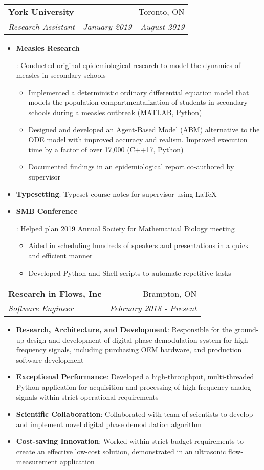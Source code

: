 \documentclass[letterpaper,10pt]{article}
\makeatletter
\newcommand{\resumeItem}[2]{
  \item\small{
    \textbf{#1}{: #2 \vspace{-2pt}}
  }
}
\newcommand{\resumeSubheading}[4]{
  \vspace{-1pt}\item[]
  \begin{tabular*}{0.98\textwidth}{l@{\extracolsep{\fill}}r}
      \hspace{-10pt}\textbf{#1} & #2 \\
      \hspace{-10pt}\textit{\small#3} & \textit{\small #4} \\
    \end{tabular*}\vspace{-5pt}
}
\newcommand{\resumeItemListStart}{\begin{itemize}}
\newcommand{\resumeItemListEnd}{\end{itemize}\vspace{-5pt}}
\makeatother
\begin{document}
    \resumeSubheading
      {York University}{Toronto, ON}
      {Research Assistant}{January 2019 - August 2019}
      \resumeItemListStart
        \resumeItem{Measles Research}
          {Conducted original epidemiological research to model the dynamics of measles in secondary schools
            \begin{itemize}
                \item Implemented a deterministic ordinary differential equation model that models the population compartmentalization of students in secondary schools during a measles outbreak (MATLAB, Python)
                \item Designed and developed an Agent-Based Model (ABM) alternative to the ODE model with improved accuracy and realism. Improved execution time by a factor of over 17,000 (C++17, Python)
                \item Documented findings in an epidemiological report co-authored by supervisor
            \end{itemize}
          }
        \resumeItem{Typesetting}
          {Typeset course notes for supervisor using \LaTeX{}}
        \resumeItem{SMB Conference}
          {Helped plan 2019 Annual Society for Mathematical Biology meeting
          \begin{itemize}
              \item Aided in scheduling hundreds of speakers and presentations in a quick and efficient manner
              \item Developed Python and Shell scripts to automate repetitive tasks
          \end{itemize}
          }
      \resumeItemListEnd

    \resumeSubheading
      {Research in Flows, Inc}{Brampton, ON}
      {Software Engineer}{February 2018 - Present}
      \resumeItemListStart
        \resumeItem{Research, Architecture, and Development}
          {Responsible for the ground-up design and development of digital phase demodulation system for high frequency signals, including purchasing OEM hardware, and production software development}
        \resumeItem{Exceptional Performance}
          {Developed a high-throughput, multi-threaded Python application for acquisition and processing of high frequency analog signals within strict operational requirements}
        \resumeItem{Scientific Collaboration}
          {Collaborated with team of scientists to develop and implement novel digital phase demodulation algorithm}
        \resumeItem{Cost-saving Innovation}
          {Worked within strict budget requirements to create an effective low-cost solution, demonstrated in an ultrasonic flow-measurement application}
      \resumeItemListEnd
\end{document}
